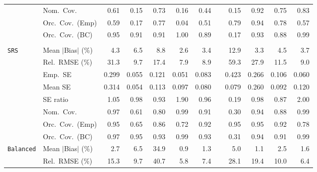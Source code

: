 \begin{landscape}
\begin{longtable}{llrrrrrrrrrr}
 & Nom.\ Cov. & 0.61 & 0.15 & 0.73 & 0.16 & 0.44 &  & 0.15 & \cellcolor{rankone}0.92 & \cellcolor{rankthree}0.75 & \cellcolor{ranktwo}0.83 \\
 & Orc.\ Cov.\ (Emp) & 0.59 & 0.17 & 0.77 & 0.04 & 0.51 &  & \cellcolor{ranktwo}0.79 & \cellcolor{rankone}0.94 & \cellcolor{rankthree}0.78 & 0.57 \\
 & Orc.\ Cov.\ (BC) & \cellcolor{rankone}0.95 & \cellcolor{rankthree}0.91 & \cellcolor{rankthree}0.91 & 1.00 & 0.89 &  & 0.17 & \cellcolor{ranktwo}0.93 & 0.88 & \cellcolor{rankthree}0.99 \\
\addlinespace[2pt]
\multicolumn{12}{l}{\textbf{Binary \& Categorical Phase-Two Covariates}} \\
\addlinespace[2pt]
\quad \texttt{SRS} & Mean $|$Bias$|$ (\%) & 4.3 & 6.5 & 8.8 & \cellcolor{rankone}2.6 & \cellcolor{rankthree}3.4 &  & 12.9 & \cellcolor{ranktwo}3.3 & 4.5 & 3.7 \\
 & Rel.\ RMSE (\%) & 31.3 & 9.7 & 17.4 & \cellcolor{rankone}7.9 & \cellcolor{ranktwo}8.9 &  & 59.3 & 27.9 & 11.5 & \cellcolor{rankthree}9.0 \\
 & Emp.\ SE & 0.299 & 0.055 & 0.121 & 0.051 & 0.083 &  & 0.423 & 0.266 & 0.106 & 0.060 \\
 & Mean SE & 0.314 & 0.054 & 0.113 & 0.097 & 0.080 &  & 0.079 & 0.260 & 0.092 & 0.120 \\
 & SE ratio & \cellcolor{rankthree}1.05 & \cellcolor{rankone}0.98 & 0.93 & 1.90 & \cellcolor{ranktwo}0.96 &  & 0.19 & \cellcolor{rankone}0.98 & 0.87 & 2.00 \\
 & Nom.\ Cov. & \cellcolor{ranktwo}0.97 & 0.61 & 0.80 & \cellcolor{rankthree}0.99 & \cellcolor{rankthree}0.91 &  & 0.30 & \cellcolor{rankone}0.94 & 0.88 & \cellcolor{rankthree}0.99 \\
 & Orc.\ Cov.\ (Emp) & \cellcolor{rankone}0.95 & 0.65 & \cellcolor{rankthree}0.86 & 0.72 & \cellcolor{ranktwo}0.92 &  & \cellcolor{rankone}0.95 & \cellcolor{rankone}0.95 & \cellcolor{ranktwo}0.92 & 0.78 \\
 & Orc.\ Cov.\ (BC) & \cellcolor{rankthree}0.97 & \cellcolor{rankone}0.95 & \cellcolor{rankthree}0.93 & 0.99 & \cellcolor{rankthree}0.93 &  & 0.31 & \cellcolor{ranktwo}0.94 & 0.91 & 0.99 \\
\addlinespace[2pt]
\quad \texttt{Balanced} & Mean $|$Bias$|$ (\%) & 2.7 & 6.5 & 34.9 & \cellcolor{rankone}0.9 & \cellcolor{rankthree}1.3 &  & 5.0 & \cellcolor{ranktwo}1.1 & 2.5 & 1.6 \\
 & Rel.\ RMSE (\%) & 15.3 & 9.7 & 40.7 & \cellcolor{rankone}5.8 & \cellcolor{rankthree}7.4 &  & 28.1 & 19.4 & 10.0 & \cellcolor{ranktwo}6.4 \\

\end{longtable}
\end{landscape}
